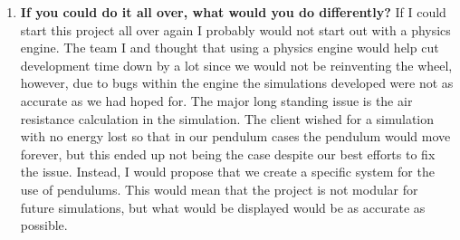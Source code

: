 \begin{enumerate}
    \item \textbf{If you could do it all over, what would you do differently?}
    If I could start this project all over again I probably would not start out with a physics engine. The team I and thought that using a physics engine would help cut development time down by a lot since we would not be reinventing the wheel, however, due to bugs within the engine the simulations developed were not as accurate as we had hoped for. The major long standing issue is the air resistance calculation in the simulation. The client wished for a simulation with no energy lost so that in our pendulum cases the pendulum would move forever, but this ended up not being the case despite our best efforts to fix the issue. Instead, I would propose that we create a specific system for the use of pendulums. This would mean that the project is not modular for future simulations, but what would be displayed would be as accurate as possible. 

\end{enumerate}